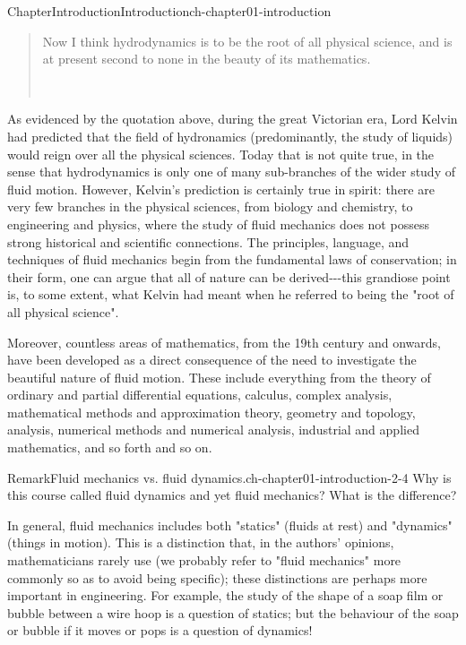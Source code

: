 \documentclass[oneside,10pt,]{book}
\numberwithin{equation}{section}
\begin{document}
\begin{chapterptx}{Chapter}{Introduction}{}{Introduction}{}{}{ch-chapter01-introduction}
\renewcommand*{\chaptername}{Chapter}
\begin{introduction}{}%
\begin{quote}%
Now I think hydrodynamics is to be the root of all physical science, and is at present second to none in the beauty of its mathematics.%
\nopagebreak\par%
\hfill{}\\\par
\end{quote}
As evidenced by the quotation above, during the great Victorian era, Lord Kelvin had predicted that the field of hydronamics (predominantly, the study of liquids) would reign over all the physical sciences. Today that is not quite true, in the sense that hydrodynamics is only one of many sub-branches of the wider study of fluid motion. However, Kelvin's prediction is certainly true in spirit: there are very few branches in the physical sciences, from biology and chemistry, to engineering and physics, where the study of fluid mechanics does not possess strong historical and scientific connections. The principles, language, and techniques of fluid mechanics begin from the fundamental laws of conservation; in their form, one can argue that all of nature can be derived-{}-{}-this grandiose point is, to some extent, what Kelvin had meant when he referred to being the "root of all physical science".%
\par
Moreover, countless areas of mathematics, from the 19th century and onwards, have been developed as a direct consequence of the need to investigate the beautiful nature of fluid motion. These include everything from the theory of ordinary and partial differential equations, calculus, complex analysis, mathematical methods and approximation theory, geometry and topology, analysis, numerical methods and numerical analysis, industrial and applied mathematics, and so forth and so on.%
\begin{remark}{Remark}{Fluid mechanics vs. fluid dynamics.}{ch-chapter01-introduction-2-4}%
Why is this course called fluid dynamics and yet fluid mechanics? What is the difference?%
\par
In general, fluid mechanics includes both "statics" (fluids at rest) and "dynamics" (things in motion). This is a distinction that, in the authors' opinions, mathematicians rarely use (we probably refer to "fluid mechanics" more commonly so as to avoid being specific); these distinctions are perhaps more important in engineering. For example, the study of the shape of a soap film or bubble between a wire hoop is a question of statics; but the behaviour of the soap or bubble if it moves or pops is a question of dynamics!%

\end{remark}
\end{introduction}
\end{chapterptx}
\end{document}

